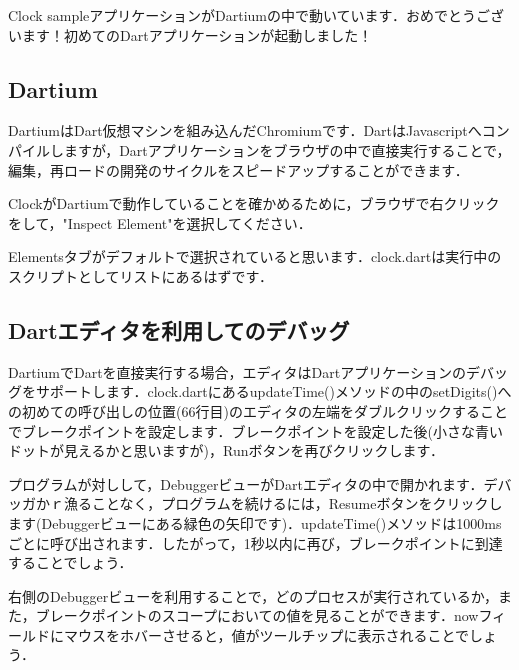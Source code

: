 
Clock sampleアプリケーションがDartiumの中で動いています．おめでとうございます！初めてのDartアプリケーションが起動しました！


\subsection{Dartium}

DartiumはDart仮想マシンを組み込んだChromiumです．DartはJavascriptへコンパイルしますが，Dartアプリケーションをブラウザの中で直接実行することで，編集，再ロードの開発のサイクルをスピードアップすることができます．

ClockがDartiumで動作していることを確かめるために，ブラウザで右クリックをして，"Inspect Element"を選択してください．


Elementsタブがデフォルトで選択されていると思います．clock.dartは実行中のスクリプトとしてリストにあるはずです．


\subsection{Dartエディタを利用してのデバッグ}

DartiumでDartを直接実行する場合，エディタはDartアプリケーションのデバッグをサポートします．clock.dartにあるupdateTime()メソッドの中のsetDigits()への初めての呼び出しの位置(66行目)のエディタの左端をダブルクリックすることでブレークポイントを設定します．ブレークポイントを設定した後(小さな青いドットが見えるかと思いますが)，Runボタンを再びクリックします．


プログラムが対しして，DebuggerビューがDartエディタの中で開かれます．デバッガかｒ漁ることなく，プログラムを続けるには，Resumeボタンをクリックします(Debuggerビューにある緑色の矢印です)．updateTime()メソッドは1000msごとに呼び出されます．したがって，1秒以内に再び，ブレークポイントに到達することでしょう．


右側のDebuggerビューを利用することで，どのプロセスが実行されているか，また，ブレークポイントのスコープにおいての値を見ることができます．nowフィールドにマウスをホバーさせると，値がツールチップに表示されることでしょう．


